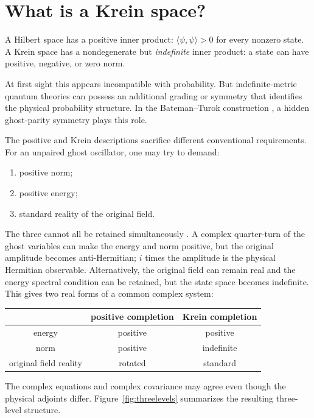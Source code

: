 \documentclass[11pt]{article}
\theoremstyle{remark}
\begin{document}
\section{What is a Krein space?}\label{sec:krein}

A Hilbert space has a positive inner product:
$\langle\psi,\psi\rangle>0$ for every nonzero state.  A Krein space has a
nondegenerate but \emph{indefinite} inner product: a state can have
positive, negative, or zero norm.

At first sight this appears incompatible with probability.  But
indefinite-metric quantum theories can possess an additional grading or
symmetry that identifies the physical probability structure.  In the
Bateman--Turok construction \cite{BT2026}, a hidden ghost-parity symmetry
plays this role.

The positive and Krein descriptions sacrifice different conventional
requirements.  For an unpaired ghost oscillator, one may try to demand:
\begin{enumerate}
\item positive norm;
\item positive energy;
\item standard reality of the original field.
\end{enumerate}
The three cannot all be retained simultaneously \cite{paperIV}.  A
complex quarter-turn of the ghost variables can make the energy and norm
positive, but the original amplitude becomes anti-Hermitian; $i$ times
the amplitude is the physical Hermitian observable.  Alternatively, the
original field can remain real and the energy spectral condition can be
retained, but the state space becomes indefinite.  This gives two real
forms of a common complex system:
\begin{center}
\begin{tabular}{c|c|c}
 & positive completion & Krein completion\\
\hline
energy & positive & positive\\
norm & positive & indefinite\\
original field reality & rotated & standard
\end{tabular}
\end{center}
The complex equations and complex covariance may agree even though the
physical adjoints differ.  Figure~\ref{fig:threelevels} summarizes the
resulting three-level structure.
\end{document}
